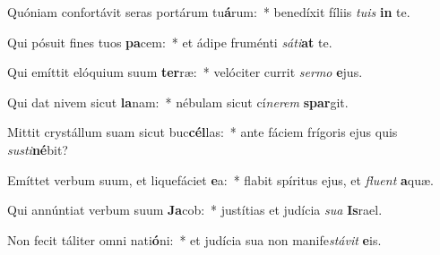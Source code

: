 \item Quóniam confortávit seras portárum tu\textbf{á}rum:~* benedíxit fíliis \textit{tuis} \textbf{in} te.
\item Qui pósuit fines tuos \textbf{pa}cem:~* et ádipe fruménti \textit{sáti}\textbf{at} te.
\item Qui emíttit elóquium suum \textbf{ter}ræ:~* velóciter currit \textit{sermo} \textbf{e}jus.
\item Qui dat nivem sicut \textbf{la}nam:~* nébulam sicut cí\tinyhspace\textit{nerem} \textbf{spar}git.
\item Mittit crystállum suam sicut buc\textbf{cél}las:~* ante fáciem frígoris ejus quis \textit{sus\-ti}\textbf{né}bit?
\item Emíttet verbum suum, et liquefáciet \textbf{e}a:~* flabit spíritus ejus, et \textit{fluent} \textbf{a}quæ.
\item Qui annúntiat verbum suum \textbf{Ja}cob:~* justítias et judícia \textit{sua} \textbf{Is}rael.
\item Non fecit táliter omni nati\textbf{ó}ni:~* et judícia sua non manife\tinyhspace\textit{stávit} \textbf{e}is.